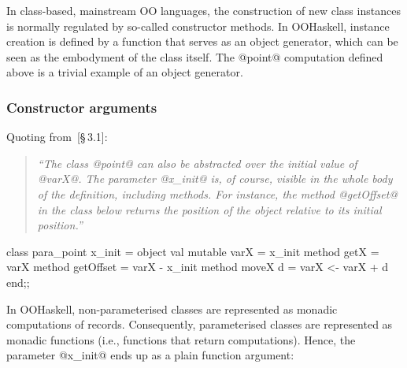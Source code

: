 \documentclass{jfp}
\begin{document}
In class-based, mainstream OO languages, the construction of new class
instances is normally regulated by so-called constructor methods. In
OOHaskell, instance creation is defined by a function that serves as
an object generator, which can be seen as the embodyment of the class
itself. The @point@ computation defined above is a trivial example of
an object generator.






\subsubsection{Constructor arguments}

Quoting from~\cite{OCaml}[\S\,3.1]:

\begin{quote}\itshape\small
``The class @point@ can also be abstracted over the initial value of
@varX@.  The parameter @x_init@ is, of course, visible in the whole
body of the definition, including methods. For instance, the method
@getOffset@ in the class below returns the position of the object
relative to its initial position.''
\end{quote}

\begin{code}
 class para_point x_init =
   object
     val mutable varX = x_init
     method getX      = varX
     method getOffset = varX - x_init
     method moveX d   = varX <- varX + d
   end;;
\end{code}

In OOHaskell, non-parameterised classes are represented as monadic
computations of records. Consequently, parameterised classes are
represented as monadic functions (i.e., functions that return
computations). Hence, the parameter @x_init@ ends up as a plain
function argument:

\end{document}
